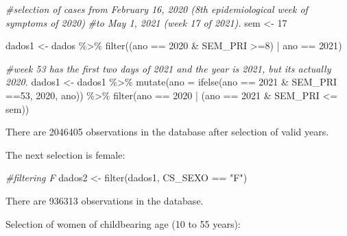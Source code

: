 \documentclass[
]{article}
\newenvironment{Shaded}{\begin{snugshade}}{\end{snugshade}}
\newcommand{\AttributeTok}[1]{\textcolor[rgb]{0.77,0.63,0.00}{#1}}
\newcommand{\CommentTok}[1]{\textcolor[rgb]{0.56,0.35,0.01}{\textit{#1}}}
\newcommand{\DecValTok}[1]{\textcolor[rgb]{0.00,0.00,0.81}{#1}}
\newcommand{\FunctionTok}[1]{\textcolor[rgb]{0.00,0.00,0.00}{#1}}
\newcommand{\NormalTok}[1]{#1}
\newcommand{\OtherTok}[1]{\textcolor[rgb]{0.56,0.35,0.01}{#1}}
\newcommand{\SpecialCharTok}[1]{\textcolor[rgb]{0.00,0.00,0.00}{#1}}
\newcommand{\StringTok}[1]{\textcolor[rgb]{0.31,0.60,0.02}{#1}}
\begin{document}
\begin{Shaded}
\begin{Highlighting}[]
\CommentTok{\#selection of cases from February 16, 2020 (8th epidemiological week of symptoms of 2020) }
\CommentTok{\#to May 1, 2021 (week 17 of 2021).}
\NormalTok{sem }\OtherTok{\textless{}{-}} \DecValTok{17}

\NormalTok{dados1 }\OtherTok{\textless{}{-}}\NormalTok{ dados }\SpecialCharTok{\%\textgreater{}\%} 
  \FunctionTok{filter}\NormalTok{((ano }\SpecialCharTok{==} \DecValTok{2020} \SpecialCharTok{\&}\NormalTok{ SEM\_PRI }\SpecialCharTok{\textgreater{}=}\DecValTok{8}\NormalTok{) }\SpecialCharTok{|}\NormalTok{ ano }\SpecialCharTok{==} \DecValTok{2021}\NormalTok{)}

\CommentTok{\#week 53 has the first two days of 2021 and the year is 2021, but it\textquotesingle{}s actually 2020.}
\NormalTok{dados1 }\OtherTok{\textless{}{-}}\NormalTok{ dados1 }\SpecialCharTok{\%\textgreater{}\%} 
  \FunctionTok{mutate}\NormalTok{(}\AttributeTok{ano =} \FunctionTok{ifelse}\NormalTok{(ano }\SpecialCharTok{==} \DecValTok{2021} \SpecialCharTok{\&}\NormalTok{ SEM\_PRI }\SpecialCharTok{==}\DecValTok{53}\NormalTok{, }\DecValTok{2020}\NormalTok{, ano)) }\SpecialCharTok{\%\textgreater{}\%}  
  \FunctionTok{filter}\NormalTok{(ano }\SpecialCharTok{==} \DecValTok{2020} \SpecialCharTok{|}\NormalTok{ (ano }\SpecialCharTok{==} \DecValTok{2021} \SpecialCharTok{\&}\NormalTok{ SEM\_PRI }\SpecialCharTok{\textless{}=}\NormalTok{ sem))}
\end{Highlighting}
\end{Shaded}

There are 2046405 observations in the database after selection of valid
years.

The next selection is female:

\begin{Shaded}
\begin{Highlighting}[]
\CommentTok{\#filtering F}
\NormalTok{dados2 }\OtherTok{\textless{}{-}} \FunctionTok{filter}\NormalTok{(dados1, CS\_SEXO }\SpecialCharTok{==} \StringTok{"F"}\NormalTok{)}
\end{Highlighting}
\end{Shaded}

There are 936313 observations in the database.

Selection of women of childbearing age (10 to 55 years):
\end{document}
